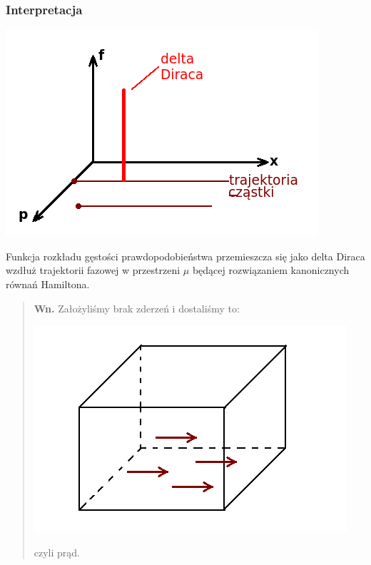\subsubsection{Interpretacja}
\begin{center}
\includegraphics[scale=0.75]{obrazki/przestrzen_fazowa3.png}
\end{center}
Funkcja rozkładu gęstości prawdopodobieństwa przemieszcza się jako delta Diraca wzdłuż trajektorii fazowej w przestrzeni $\mu$ będącej rozwiązaniem kanonicznych równań Hamiltona.\\
\begin{verse}\textbf{Wn. }Założyliśmy brak zderzeń i dostaliśmy to:
\begin{center}\includegraphics[scale=0.75]{obrazki/przestrzen_fazowa4.png}\end{center}
czyli prąd. \end{verse}


